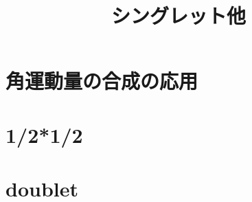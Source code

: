 \documentclass[a4j]{jarticle}
\title{シングレット他}
\begin{document}
\section{角運動量の合成の応用}


\section{1/2*1/2}

\section{doublet}
\end{document}
